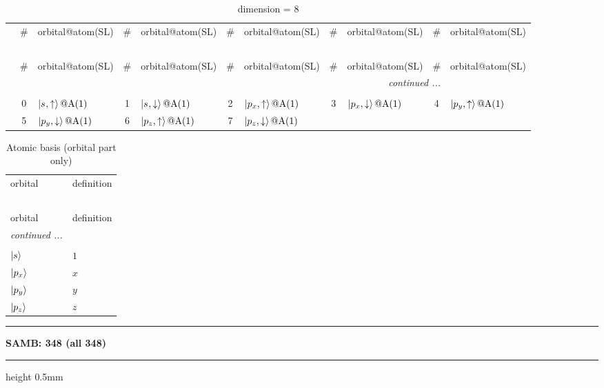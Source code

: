 \documentclass[fleqn,10pt,landscape]{jsarticle}
\begin{document}
\renewcommand{\arraystretch}{1.6}
\begin{longtable}[l]{c|cl|cl|cl|cl|cl}
\captionsetup{justification=raggedright, singlelinecheck=off}
\caption{dimension = 8}
 \\
 \hline \hline
 & \# & orbital@atom(SL) & \# & orbital@atom(SL) & \# & orbital@atom(SL) & \# & orbital@atom(SL) & \# & orbital@atom(SL) \\ \hline \endfirsthead

\multicolumn{10}{l}{\tablename\ \thetable{}} \\
 \hline \hline
 & \# & orbital@atom(SL) & \# & orbital@atom(SL) & \# & orbital@atom(SL) & \# & orbital@atom(SL) & \# & orbital@atom(SL) \\ \hline \endhead

 \hline \hline
\multicolumn{10}{r}{\footnotesize\it continued ...} \\ \endfoot

 \hline \hline
\multicolumn{10}{r}{} \\ \endlastfoot

 & 0 & $\ket{s_{},\uparrow}@{\rm A}(1)$ & 1 & $\ket{s_{},\downarrow}@{\rm A}(1)$ & 2 & $\ket{p_{x},\uparrow}@{\rm A}(1)$ & 3 & $\ket{p_{x},\downarrow}@{\rm A}(1)$ & 4 & $\ket{p_{y},\uparrow}@{\rm A}(1)$ \\
& 5 & $\ket{p_{y},\downarrow}@{\rm A}(1)$ & 6 & $\ket{p_{z},\uparrow}@{\rm A}(1)$ & 7 & $\ket{p_{z},\downarrow}@{\rm A}(1)$ &  &  &  &  \\
\end{longtable}
\renewcommand{\arraystretch}{1.6}
\begin{longtable}[l]{ll}
\captionsetup{justification=raggedright, singlelinecheck=off}
\caption{Atomic basis (orbital part only)}
 \\
 \hline \hline
orbital & definition \\ \hline \endfirsthead

\multicolumn{1}{l}{\tablename\ \thetable{}} \\
 \hline \hline
orbital & definition \\ \hline \endhead

 \hline \hline
\multicolumn{1}{r}{\footnotesize\it continued ...} \\ \endfoot

 \hline \hline
\multicolumn{1}{r}{} \\ \endlastfoot

$ \ket{s} $ & $ 1 $ \\ \hline
$ \ket{p_{x}} $ & $ x $ \\
$ \ket{p_{y}} $ & $ y $ \\
$ \ket{p_{z}} $ & $ z $ \\
\end{longtable}
\vspace{5mm}
\noindent \rule[0.5mm]{5mm}{0.5mm}\hspace{3mm}\textbf{SAMB: 348 (all 348)}\hspace{3mm}\leaders\hrule height 0.5mm\hfill\kern0pt
\vspace{3mm}
\end{document}
